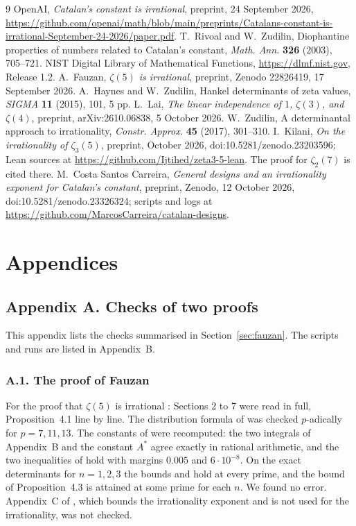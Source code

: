 \documentclass[11pt]{article}
\theoremstyle{definition}
\begin{document}
\begin{thebibliography}{9}
 OpenAI, \emph{Catalan's constant is irrational}, preprint, 24 September 2026, \url{https://github.com/openai/math/blob/main/preprints/Catalans-constant-is-irrational-September-24-2026/paper.pdf}.
 T.~Rivoal and W.~Zudilin, Diophantine properties of numbers related to Catalan's constant, \emph{Math. Ann.} \textbf{326} (2003), 705--721.
 NIST Digital Library of Mathematical Functions, \url{https://dlmf.nist.gov}, Release 1.2.
 A.~Fauzan, \emph{$\zeta(5)$ is irrational}, preprint, Zenodo 22826419, 17 September 2026.
 A.~Haynes and W.~Zudilin, Hankel determinants of zeta values, \emph{SIGMA} \textbf{11} (2015), 101, 5 pp.
 L.~Lai, \emph{The linear independence of $1$, $\zeta(3)$, and $\zeta(4)$}, preprint, arXiv:2610.06838, 5 October 2026.
 W.~Zudilin, A determinantal approach to irrationality, \emph{Constr. Approx.} \textbf{45} (2017), 301--310.
 I.~Kilani, \emph{On the irrationality of $\zeta_3(5)$}, preprint, October 2026, doi:10.5281/zenodo.23203596; Lean sources at \url{https://github.com/Ijtihed/zeta3-5-lean}. The proof for $\zeta_2(7)$ is cited there.
 M.~Costa Santos Carreira, \emph{General designs and an irrationality exponent for Catalan's constant}, preprint, Zenodo, 12 October 2026, doi:10.5281/zenodo.23326324; scripts and logs at \url{https://github.com/MarcosCarreira/catalan-designs}.
\end{thebibliography}

\clearpage
\section*{Appendices}

\subsection*{Appendix A. Checks of two proofs}

This appendix lists the checks summarised in Section~\ref{sec:fauzan}. The scripts and runs are listed in Appendix~B.

\subsubsection*{A.1. The proof of Fauzan}

For the proof that $\zeta(5)$ is irrational \cite{Fauzan}: Sections 2 to 7 were read in full, Proposition~4.1 line by line. The distribution formula of \cite[Lemma~3.2]{Fauzan} was checked $p$-adically for $p=7,11,13$. The constants of \cite[Appendices~A and~B]{Fauzan} were recomputed: the two integrals of Appendix~B and the constant $A^*$ agree exactly in rational arithmetic, and the two inequalities of \cite[Lemma~6.1]{Fauzan} hold with margins $0.005$ and $6\cdot10^{-8}$. On the exact determinants for $n=1,2,3$ the bounds \cite[(3.12)]{Fauzan} and \cite[Proposition~4.3]{Fauzan} hold at every prime, and the bound of Proposition~4.3 is attained at some prime for each $n$. We found no error. Appendix~C of \cite{Fauzan}, which bounds the irrationality exponent and is not used for the irrationality, was not checked.
\end{document}
